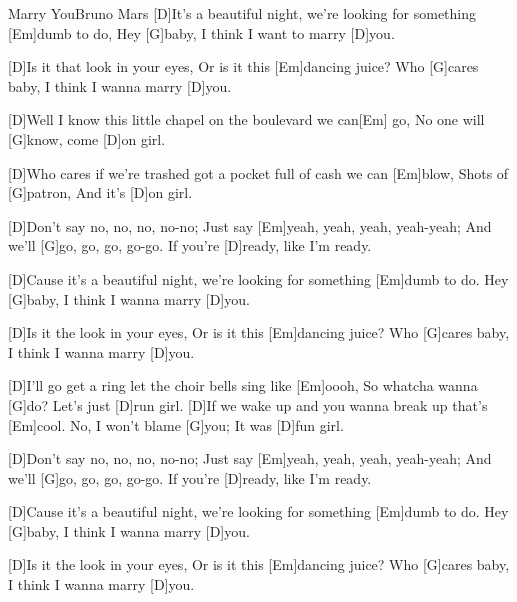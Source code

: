 \documentclass[../main.tex]{subfiles}
\begin{document}
\begin{song}{Marry You}{Bruno Mars}{}
[D]It’s a beautiful night, we’re looking for something [Em]dumb to do,
Hey [G]baby, I think I want to marry [D]you.

[D]Is it that look in your eyes,
Or is it this [Em]dancing juice?
Who [G]cares baby, I think I wanna marry [D]you.

[D]Well I know this little chapel on the boulevard we can[Em] go,
No one will [G]know, come [D]on girl.

[D]Who cares if we're trashed got a pocket full of cash we can [Em]blow,
Shots of [G]patron, And it's [D]on girl.

[D]Don't say no, no, no, no-no;
Just say [Em]yeah, yeah, yeah, yeah-yeah;
And we'll [G]go, go, go, go-go.
If you're [D]ready, like I'm ready.

[D]Cause it's a beautiful night, we're looking for something [Em]dumb to do.
Hey [G]baby, I think I wanna marry [D]you.

[D]Is it the look in your eyes,
Or is it this [Em]dancing juice?
Who [G]cares baby, I think I wanna marry [D]you.

[D]I'll go get a ring let the choir bells sing like [Em]oooh,
So whatcha wanna [G]do? Let's just [D]run girl.
[D]If we wake up and you wanna break up that's [Em]cool.
No, I won't blame [G]you; It was [D]fun girl.

[D]Don't say no, no, no, no-no;
Just say [Em]yeah, yeah, yeah, yeah-yeah;
And we'll [G]go, go, go, go-go.
If you're [D]ready, like I'm ready.

[D]Cause it's a beautiful night, we're looking for something [Em]dumb to do.
Hey [G]baby, I think I wanna marry [D]you.

[D]Is it the look in your eyes,
Or is it this [Em]dancing juice?
Who [G]cares baby, I think I wanna marry [D]you.
\end{song}
\end{document}
